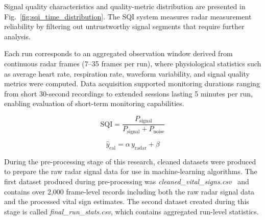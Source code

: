 \documentclass[conference]{IEEEtran}
\begin{document}
Signal quality characteristics and quality-metric distribution are presented in Fig.~\ref{fig:sqi_time_distribution}. The SQI system measures radar measurement reliability by filtering out untrustworthy signal segments that require further analysis.

Each run corresponds to an aggregated observation window derived from continuous radar frames (7--35 frames per run), where physiological statistics such as average heart rate, respiration rate, waveform variability, and signal quality metrics were computed. Data acquisition supported monitoring durations ranging from short 30-second recordings to extended sessions lasting 5 minutes per run, enabling evaluation of short-term monitoring capabilities.

\begin{equation}
\text{SQI} = \frac{P_{\text{signal}}}{P_{\text{signal}} + P_{\text{noise}}}
\end{equation}

\begin{equation}
\hat{y}_{\text{cal}} = \alpha \, y_{\text{radar}} + \beta
\end{equation}

During the pre-processing stage of this research, cleaned datasets were produced to prepare the raw radar signal data for use in machine-learning algorithms. The first dataset produced during pre-processing was \textit{cleaned\_vital\_signs.csv}~\cite{ref4,ref5} and contains over 2,000 frame-level records including both the raw radar signal data and the processed vital sign estimates. The second dataset created during this stage is called \textit{final\_run\_stats.csv}, which contains aggregated run-level statistics.

\begin{table}[t]
\centering
\caption{Structure of the Experimental Dataset}
\label{tab:dataset_structure}
\renewcommand{\arraystretch}{1.2}

\end{table}
\end{document}
